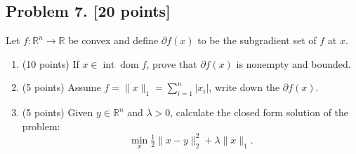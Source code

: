\documentclass[11pt,a4paper]{article}
\begin{document}
\subsection{Problem 7. [20 points]}
Let \(f : \mathbb{R}^{n} \to \mathbb{R}\) be convex and define \(\partial f(x)\) to be the subgradient set of \(f\) at \(x\).
\begin{enumerate}[label=(\roman*)]
    \item (10 points) If \(x \in \operatorname{int} \operatorname{dom} f\), prove that \(\partial f(x)\) is nonempty and bounded.
    \item (5 points) Assume \(f = \|x\|_{1} = \sum_{i=1}^{n} |x_{i}|\), write down the \(\partial f(x)\).
    \item (5 points) Given \(y \in \mathbb{R}^{n}\) and \(\lambda > 0\), calculate the closed form solution of the problem:
    \[
    \min_{x} \tfrac12 \|x - y\|_{2}^{2} + \lambda \|x\|_{1}.
    \]
\end{enumerate}
\end{document}
